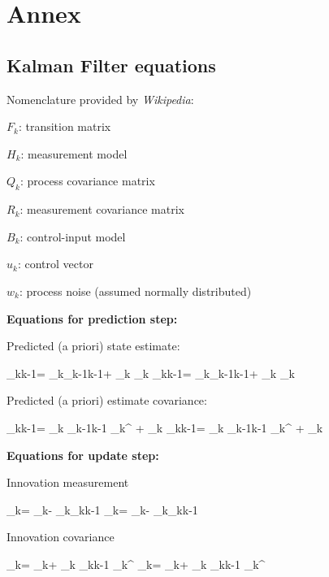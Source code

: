 \newpage
\setlength{\parskip}{1em}
\section{Annex}
\label{sec:annex}
\subsection{Kalman Filter equations}
Nomenclature provided by \textit{Wikipedia}:

$F_k$: transition matrix

$H_k$: measurement model

$Q_k$: process covariance matrix

$R_k$: measurement covariance matrix

$B_k$: control-input model

$u_k$: control vector

$w_k$: process noise (assumed normally distributed)

\textbf{Equations for prediction step:}

Predicted (a priori) state estimate:

	{_{k\mid k-1}= _{k}{}_{k-1\mid k-1}+ _{k} _{k}} {_{k\mid k-1}= _{k}{}_{k-1\mid k-1}+ _{k} _{k}}
	
Predicted (a priori) estimate covariance:

	{\displaystyle {} _{k\mid k-1}= _{k} _{k-1\mid k-1} _{k}^{ }+ _{k}} {\displaystyle {} _{k\mid k-1}= _{k} _{k-1\mid k-1} _{k}^{ }+ _{k}}
	
\textbf{Equations for update step:}

Innovation measurement

	{_{k}= _{k}- _{k}{}_{k\mid k-1}} {}_{k}= _{k}- _{k}{}_{k\mid k-1}
	
Innovation covariance

	{\displaystyle {} _{k}= _{k}+ _{k} _{k\mid k-1} _{k}^{ }} {\displaystyle {} _{k}= _{k}+ _{k} _{k\mid k-1} _{k}^{ }}
	
